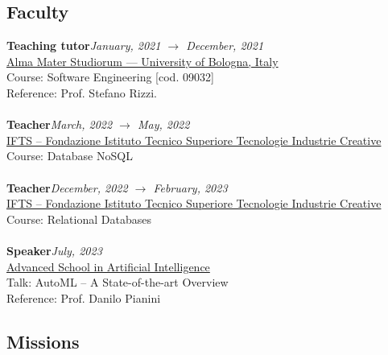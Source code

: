 \subsection*{Faculty}

\textbf{Teaching tutor}\hfill \textit{January, 2021 $\rightarrow$ December, 2021}\\
\underline{Alma Mater Studiorum --- University of Bologna, Italy}\\
Course: Software Engineering [cod. 09032]\\
Reference: Prof. Stefano Rizzi.\\
\\
\textbf{Teacher}\hfill \textit{March, 2022 $\rightarrow$ May, 2022}\\
\underline{IFTS -- Fondazione Istituto Tecnico Superiore Tecnologie Industrie Creative}\\
Course: Database NoSQL\\
\\
\textbf{Teacher}\hfill \textit{December, 2022 $\rightarrow$ February, 2023}\\
\underline{IFTS -- Fondazione Istituto Tecnico Superiore Tecnologie Industrie Creative}\\
Course: Relational Databases\\
\\
\clearpage
\newpage
\noindent\textbf{Speaker}\hfill \textit{July, 2023}\\
\underline{Advanced School in Artificial Intelligence}\\
Talk: AutoML -- A State-of-the-art Overview\\
Reference: Prof. Danilo Pianini

\subsection*{Missions}


